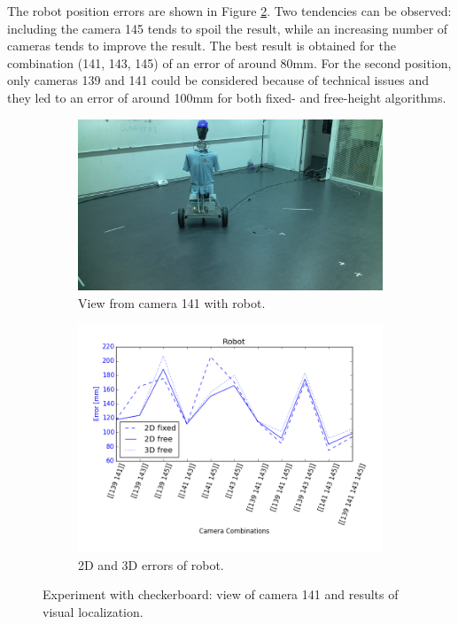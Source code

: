 The robot position errors are shown in Figure \ref{fig:res2_combi}. Two tendencies can be observed:
including the camera 145 tends to spoil the result, while an increasing number of cameras tends to improve the result. The best result is obtained for the combination (141, 143, 145) of an error of around 80mm.
For the second position, only cameras 139 and 141 could be considered because of technical issues and they led to an error of around 100mm for both fixed- and free-height algorithms. 
\begin{figure}
    \centering
    \begin{subfigure}{0.49\linewidth}
        \centering
        \includegraphics[width=\linewidth]{files/res2_0_image_141.png}
        \caption{View from camera 141 with robot.}
        \label{fig:res2_0_image_141}
    \end{subfigure}
    \begin{subfigure}{0.49\linewidth}
        \centering
        \includegraphics[width=\linewidth]{files/res2_combi_rob.png}
        \caption{2D and 3D errors of robot.}
        \label{fig:res2_combi}
    \end{subfigure}
    \caption{Experiment with checkerboard: view of camera 141 and results of visual localization.}
    \label{fig:experiment2_2}
\end{figure}

